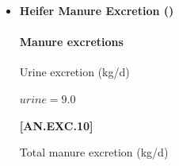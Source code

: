 \documentclass{article}
\begin{document}
\begin{refsection}
\begin{itemize}
            {\raggedleft \textbf{[AN.EXC.7]}\par}
            \vspace{0.5cm} 
            
Urine N excretion (kg/d)
        \vspace{0.5cm}
    
    \begin{center}
        \(urine\_nitrogen = 0.45 * manure\_nitrogen\)
    \end{center}
        \vspace{0.5cm} 
    
            {\raggedleft \textbf{[AN.EXC.8]}\par}
            \vspace{0.5cm} 

Manure total ammoniacal nitrogen (kg/d) 
        \vspace{0.5cm}
    
    \begin{center}
        \(manure\_total\_ammoniacal\_nitrogen = urine\_nitrogen\)
    \end{center}
        \vspace{0.5cm} 
    
            {\raggedleft \textbf{[AN.EXC.9]}\par}
            \vspace{0.5cm} 

\item \textbf{Heifer Manure Excretion ()}
\vspace{0.2cm}

\paragraph{Manure excretions}
\vspace{-0.25cm}
        
Urine excretion (kg/d)
        \vspace{0.5cm}
    
    \begin{center}
        \(urine=9.0\)
    \end{center}
        \vspace{0.5cm} 
    
            {\raggedleft \textbf{[AN.EXC.10]}\par}
            \vspace{0.5cm} 

Total manure excretion (kg/d)
        \vspace{0.5cm}
    

\end{itemize}
\end{refsection}
\end{document}
